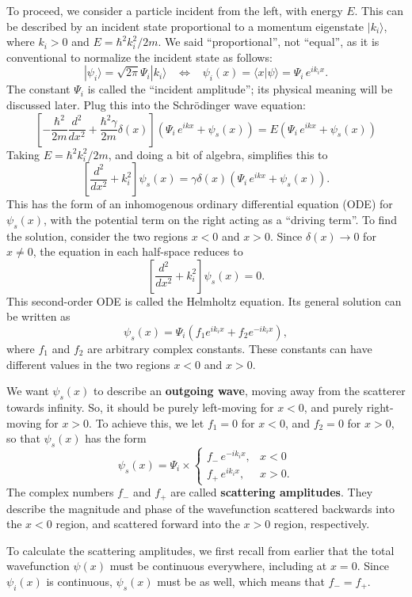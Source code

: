 \documentclass[pra,11pt]{revtex4}
\begin{document}
To proceed, we consider a particle incident from the left, with
energy $E$.  This can be described by an incident state proportional
to a momentum eigenstate $|k_i\rangle$, where $k_i > 0$ and $E =
\hbar^2k_i^2/2m$.  We said ``proportional'', not ``equal'', as it
is conventional to normalize the incident state as follows:
$$|\psi_i\rangle = \sqrt{2\pi}\Psi_i |k_i\rangle \;\;\; \Leftrightarrow\;\;\; \psi_i(x) = \langle x|\psi\rangle = \Psi_i \, e^{ik_i x}.$$
The constant $\Psi_i$ is called the ``incident amplitude''; its
physical meaning will be discussed later.  Plug this into the
Schr\"odinger wave equation:
$$\left[-\frac{\hbar^2}{2m} \frac{d^2}{dx^2} + \frac{\hbar^2\gamma}{2m}\delta(x)\right] \left(\Psi_i \, e^{ikx} + \psi_s(x) \right) = E \left(\Psi_i \, e^{ikx} + \psi_s(x) \right)$$
Taking $E = \hbar^2k_i^2/2m$, and doing a bit of algebra, simplifies this to
$$\left[ \frac{d^2}{dx^2} + k_i^2\right] \psi_s(x) =  \gamma \delta(x) \left(\Psi_i \, e^{ikx} + \psi_s(x) \right).$$
This has the form of an inhomogenous ordinary differential equation (ODE)
for $\psi_s(x)$, with the potential term on the right acting
as a ``driving term''.  To find the solution, consider the two regions $x <
0$ and $x > 0$.  Since $\delta(x) \rightarrow 0$ for $x \ne 0$, the
equation in each half-space reduces to
$$\left[\frac{d^2}{dx^2} + k_i^2\right] \psi_s(x) = 0.$$
This second-order ODE is called the Helmholtz equation.  Its general
solution can be written as
$$\psi_s(x) = \Psi_i \left(f_1 e^{ik_i x} + f_2 e^{-ik_i x}\right),$$
where $f_1$ and $f_2$ are arbitrary complex constants.  These
constants can have different values in the two regions $x < 0$ and $x
> 0$.

We want $\psi_s(x)$ to describe an \textbf{outgoing wave}, moving away
from the scatterer towards infinity.  So, it should be purely
left-moving for $x < 0$, and purely right-moving for $x > 0$.  To
achieve this, we let $f_1 = 0$ for $x < 0$, and $f_2 = 0$ for $x > 0$,
so that $\psi_s(x)$ has the form
$$\psi_s(x) = \Psi_i \times \begin{cases}f_- \,e^{-ik_ix}, & x < 0 \\ f_+ \,e^{ik_ix}, & x > 0.\end{cases}$$
The complex numbers $f_-$ and $f_+$ are called \textbf{scattering
  amplitudes}.  They describe the magnitude and phase of the
wavefunction scattered backwards into the $x<0$ region, and scattered
forward into the $x > 0$ region, respectively.

To calculate the scattering amplitudes, we first recall from earlier
that the total wavefunction $\psi(x)$ must be continuous everywhere,
including at $x = 0$.  Since $\psi_i(x)$ is continuous, $\psi_s(x)$
must be as well, which means that $f_- = f_+$.
\end{document}
